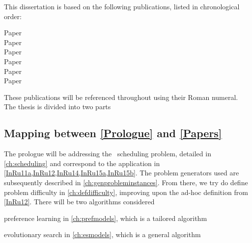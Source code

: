This dissertation is based on the following publications, listed in 
chronological order:
{\raggedright
\begin{description} 
    \item[Paper ] 
    \item[Paper ] 
    \item[Paper  ] 
    \item[Paper  ] 
    \item[Paper ] 
    \item[Paper ] 
\end{description}}

\noindent These publications will be referenced throughout using their Roman 
numeral. 
The thesis is divided into two parts
\begin{enumerate*}[label={{}}]
    \item \emph{}
    \item \emph{}
\end{enumerate*}
\makeatletter 
{}
\makeatother

\clearpage
\subsection*{Mapping between \cref{Prologue} and \cref{Papers}}
The prologue will be addressing the \jsp\ scheduling problem, detailed in 
\cref{ch:scheduling} and correspond to the application in 
\cref{InRu11a,InRu12,InRu14,InRu15a,InRu15b}. The problem generators 
used are subsequently described in \cref{ch:genprobleminstances}.
From there, we try do define problem difficulty in \cref{ch:defdifficulty}, 
improving upon the ad-hoc definition from \cref{InRu12}. 
There will be two algorithms considered
\begin{enumerate*}
    \item preference learning in \cref{ch:prefmodels}, which is a tailored 
    algorithm
    \item evolutionary search in \cref{ch:esmodels}, which is a general 
    algorithm
\end{enumerate*}

